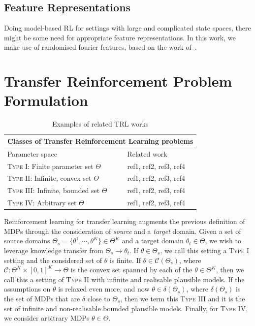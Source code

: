 \subsection{Feature Representations}

Doing model-based RL for settings with large and complicated state spaces, there might be some need for appropriate feature representations. In this work, we make use of randomised fourier features, based on the work of~\cite{ren2021free}.

\section{Transfer Reinforcement Problem Formulation}\label{sec:trl}

\begin{table}[!t]
\centering
\caption{Examples of related TRL works}
\begin{tabular}{ |p{6cm}|p{5cm}|  }
 \hline
 \multicolumn{2}{|c|}{Classes of Transfer Reinforcement Learning problems} \\
 \hline
 Parameter space&Related work\\
 \hline
 \textsc{Type I:} Finite parameter set $\Theta$ & ref1, ref2, ref3, ref4\\
 \textsc{Type II:} Infinite, convex set $\Theta$ & ref1, ref2, ref3, ref4\\
 \textsc{Type III:} Infinite, bounded set $\Theta$ & ref1, ref2, ref3, ref4\\
 \textsc{Type IV:} Arbitrary set $\Theta$& ref1, ref2, ref3, ref4\\
 \hline
\end{tabular}
\end{table}

Reinforcement learning for transfer learning augments the previous definition of MDPs through the consideration of \emph{source} and a \emph{target} domain. Given a set of source domains $\Theta_s = \{\theta^1, \cdots, \theta^K\} \in \Theta^K$ and a target domain $\theta_t \in \Theta$, we wish to leverage knowledge transfer from $\Theta_s \rightarrow \theta_t$. If $\theta \in \Theta_s$, we call this setting a \textsc{Type I} setting and the considered set of $\theta$ is finite. If $\theta \in \mathcal{C}(\Theta_s)$, where $\mathcal{C} : \Theta^K \times [0, 1]^K \rightarrow \Theta$ is the convex set spanned by each of the $\theta \in \Theta^K$, then we call this a setting of \textsc{Type II} with infinite and realisable plausible models. If the assumptions on $\theta$ is relaxed even more, and now $\theta \in \delta(\Theta_s)$, where $\delta(\Theta_s)$ is the set of MDPs that are $\delta$ close to $\Theta_s$, then we term this \textsc{Type III} and it is the set of infinite and non-realisable bounded plausible models. Finally, for \textsc{Type IV}, we consider arbitrary MDPs $\theta \in \Theta$.


